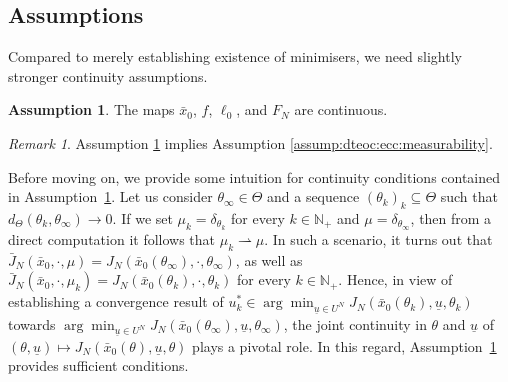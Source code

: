 \documentclass[letterpaper, 10 pt, conference]{IEEEconf}  %
\newcommand{\Np}{\mathbb{N}_+} %
\newcommand{\weak}{\rightharpoonup} %
\newcommand{\es}{\bar{x}} %
\newcommand{\is}[1]{{\underline{#1}}} %
\theoremstyle{theorem}
\theoremstyle{definition}
\newtheorem{assumption}{Assumption}
\theoremstyle{remark}
\newtheorem{remark}{Remark}
\begin{document}
\subsection{Assumptions}
Compared to merely establishing existence of minimisers, we need slightly stronger continuity assumptions.
\begin{assumption} \label{assump:dteoc:additionalContinuity}
The maps $\es_0$, $f$, $\ell_0$, and $F_N$ are continuous.
\end{assumption}
\begin{remark} 
Assumption \ref{assump:dteoc:additionalContinuity} implies Assumption \ref{assump:dteoc:ecc:measurability}.
\end{remark}
Before moving on, we provide some intuition for continuity conditions contained in Assumption~\ref{assump:dteoc:additionalContinuity}. 
Let us consider $\theta_\infty \in \Theta$ and a sequence $(\theta_k)_k\subseteq \Theta$ such that $d_\Theta(\theta_k, \theta_\infty )\to 0$. 
If we set $\mu_k = \delta_{\theta_k}$ for every $k\in \Np$ and $\mu = \delta_{\theta_\infty}$, then from a direct computation it follows that $\mu_k \weak \mu $.
In such a scenario, it turns out that $\bar J_N(\bar x_0, \cdot , \mu) = J_N(\bar x_0(\theta_\infty), \cdot , \theta_\infty)$, as well as $\bar J_N(\bar x_0, \cdot , \mu_k) = J_N(\bar x_0(\theta_k), \cdot , \theta_k)$ for every $k \in \Np$. 
Hence, in view of establishing a convergence result of $u^*_k \in \arg \min_{\is{u}\in U^N} J_N(\bar x_0(\theta_k), \is{u}, \theta_k)$ towards $\arg \min_{\is{u}\in U^N} J_N(\bar x_0(\theta_\infty), \is{u}, \theta_\infty)$, the joint continuity in $\theta$ and $\is{u}$ of $(\theta, \is{u})\mapsto J_N(\bar x_0(\theta), \is{u}, \theta)$ plays a pivotal role.
In this regard, Assumption~\ref{assump:dteoc:additionalContinuity} provides sufficient conditions.
\end{document}
